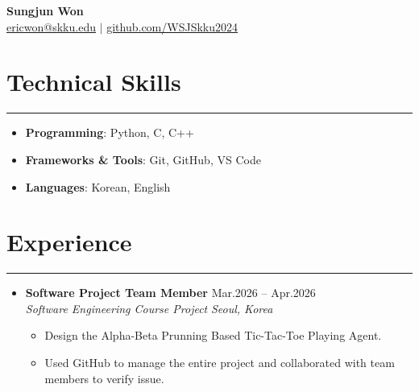 \documentclass[letterpaper, 10pt]{article}
\begin{document}
 
 
\begin{center} 
    \textbf{\LARGE Sungjun Won} \\ \vspace{2pt} 
    \href{mailto:yourmail@skku.edu}{\underline{ericwon@skku.edu}} $|$ 
    \href{https://github.com/yourid}{\underline{github.com/WSJSkku2024}} 
\end{center} 
 
\section*{Technical Skills} 
\hrule 
\vspace{4pt} 
\begin{itemize} 
    \item[] \textbf{Programming}: Python, C, C++
    \item[] \textbf{Frameworks \& Tools}: Git, GitHub, VS Code
    \item[] \textbf{Languages}: Korean, English
\end{itemize} 
 
\section*{Experience} 
\hrule 
\vspace{4pt} 
\begin{itemize} 
    \item[] 
        \textbf{Software Project Team Member} \hfill Mar.2026 -- Apr.2026 \\ %
        \textit{Software Engineering Course Project} \hfill \textit{Seoul, Korea} 
        \begin{itemize} 
            \item Design the Alpha-Beta Prunning Based Tic-Tac-Toe Playing Agent.
            \item Used GitHub to manage the entire project and collaborated with team members to verify issue.
        \end{itemize} 
\end{itemize} 
 
\end{document}

